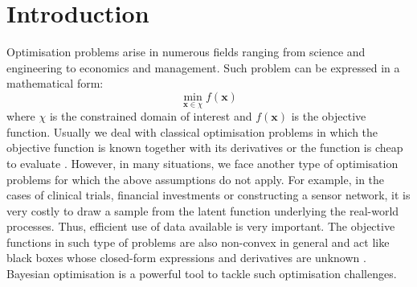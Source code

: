 \documentclass[a4paper,11pt]{report}
\begin{document}
\tableofcontents

\chapter{Introduction}

Optimisation problems arise in numerous fields ranging from science and engineering to economics and management. Such problem can be  expressed in a mathematical form: 
	\begin{equation}
		\min_{\mathbf{x} \in \chi} f(\mathbf{x})
	\end{equation}
where  $\chi$ is the constrained domain of interest and $f(\mathbf{x})$ is the objective function. Usually we deal with classical optimisation problems in which the objective function is known together with its derivatives or the function is cheap to evaluate \cite{hennig2012entropy}. However, in many situations, we face another type of optimisation problems for which the above assumptions do not apply. For example, in the cases of clinical trials, financial investments or constructing a sensor network, it is very costly to draw a sample from the latent function underlying the real-world processes. Thus, efficient use of data available is very important. The objective functions in such type of problems are also non-convex in general and act like black boxes whose closed-form expressions and derivatives are unknown \cite{brochu2010tutorial}. Bayesian optimisation is a powerful tool to tackle such optimisation challenges. 
\\\\
\end{document}
